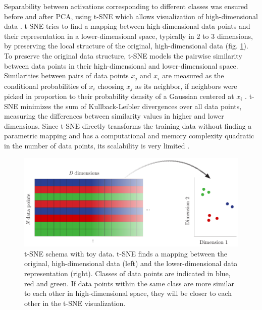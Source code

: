 \documentclass[10pt]{article}
\begin{document}
Separability between activations corresponding to different classes was ensured before and after \gls{PCA}, using \gls{t-SNE} which allows visualization of high-dimensional data \cite{Maaten2008VisualizingDU}. \gls{t-SNE} tries to find a mapping between high-dimensional data points and their representation in a lower-dimensional space, typically in 2 to 3 dimensions, by preserving the local structure of the original, high-dimensional data (fig. \ref{fig:t-SNE-schema}). To preserve the original data structure, \gls{t-SNE} models the pairwise similarity between data points in their high-dimensional and lower-dimensional space. Similarities between pairs of data points $x_j$ and $x_i$ are measured as the conditional probabilities of $x_i$ choosing $x_j$ as its neighbor, if neighbors were picked in proportion to their probability density of a Gaussian centered at $x_i$ \cite{Maaten2008VisualizingDU}. \gls{t-SNE} minimizes the sum of Kullback-Leibler divergences over all data points, measuring the differences between similarity values in higher and lower dimensions. Since \gls{t-SNE} directly transforms the training data without finding a parametric mapping and has a computational and memory complexity quadratic in the number of data points, its scalability is very limited \cite{Maaten2008VisualizingDU}.

\begin{figure}[H]
	\centering
	\includegraphics[width=.9\textwidth]{Schema/t-SNE-schema}
	\caption{\gls{t-SNE} schema with toy data. \gls{t-SNE} finds a mapping between the original, high-dimensional data (left) and the lower-dimensional data representation (right). Classes of data points are indicated in blue, red and green. If data points within the same class are more similar to each other in high-dimensional space, they will be closer to each other in the \gls{t-SNE} visualization.}
	\label{fig:t-SNE-schema}
\end{figure}
\end{document}
